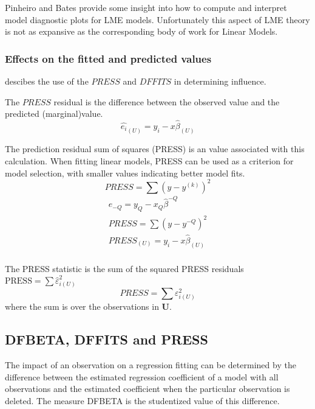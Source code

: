 \documentclass[12pt, a4paper]{report}
\theoremstyle{plain}
\theoremstyle{definition}
\theoremstyle{remark}
\begin{document}
	
	Pinheiro and Bates provide some insight into how to compute and interpret model diagnostic plots for LME models. Unfortunately this aspect of LME theory is not as expansive as the corresponding body of work for Linear Models.
	
	

	\subsubsection{Effects on the fitted and predicted values}
	\citet{schabenberger} descibes the use of the $PRESS$ and $DFFITS$ in determining influence.
	
	The $PRESS$ residual is the difference between the observed value and the predicted (marginal)value.
	\begin{equation}
	\hat{e_{i}}_{(U)} = y_{i} - x\hat{\beta}_{(U)}
	\end{equation}
	
	The prediction residual sum of squares (PRESS) is an value associated with this calculation. When fitting linear models, PRESS can be used as a criterion for model selection, with smaller values indicating better model fits.
	\begin{equation}
	PRESS = \sum(y-y^{(k)})^2
	\end{equation}
	\begin{eqnarray*}
		e_{-Q} = y_{Q} - x_{Q}\hat{\beta}^{-Q}\\
		PRESS = \sum(y-y^{-Q})^2\\
		PRESS_{(U)} = y_{i} - x\hat{\beta}_{(U)}\\
	\end{eqnarray*}
	
	The PRESS statistic is the sum of the squared PRESS residuals
	$\mbox{PRESS} = \sum \hat{\varepsilon}^2_{i(U)}$
	\[ PRESS = \sum \varepsilon^2_{i(U)} \]
	where the sum is over the observations in $\boldsymbol{U}$.
	
	
	
	
	
	

	\subsection{DFBETA, DFFITS and PRESS}
	The impact of an observation on a regression fitting can be determined by the difference between the estimated regression coefficient of a model with all observations and the estimated coefficient when the particular observation is deleted. The measure DFBETA is the studentized value of this difference. 
	
\end{document}
